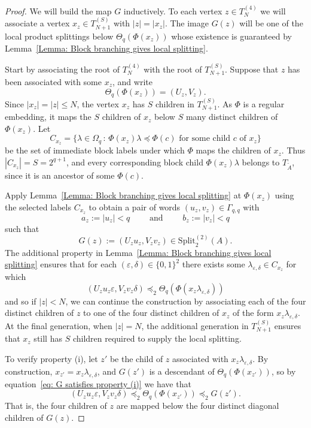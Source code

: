 \documentclass[11pt]{amsart}
\newcommand\labs[1]{\left\lvert#1\right\rvert}
\newcommand{\Split}{\mathrm{Split}}
\renewcommand{\leq}{\leqslant}
\theoremstyle{plain}
\theoremstyle{definition}
\theoremstyle{remark}
\begin{document}
\begin{proof}
We will build the map $G$ inductively. To each vertex $z \in T_N^{(4)}$ we will associate a vertex $x_z \in T_{N+1}^{(S)}$ with $\labs{z} = \labs{x_z}$. The image $G(z)$ will be one of the local product splittings below $\Theta_q(\Phi(x_z))$ whose existence is guaranteed by Lemma~\ref{Lemma: Block branching gives local splitting}.

Start by associating the root of $T_N^{(4)}$ with the root of $T_{N+1}^{(S)}$. Suppose that $z$ has been associated with some $x_z$, and write
\[ \Theta_q(\Phi(x_z)) = (U_z,V_z).\]
Since $\labs{x_z} = \labs{z} \leq N$, the vertex $x_z$ has $S$ children in $T_{N+1}^{(S)}$. As $\Phi$ is a regular embedding, it maps the $S$ children of $x_z$ below $S$ many distinct children of $\Phi(x_z)$. Let
\[ C_{x_z}=\{ \lambda \in \Omega_q \, : \, \Phi(x_z) \lambda \preceq \Phi(c) \text{ for some child } c \text{ of }x_z\}\]
be the set of immediate block labels under which $\Phi$ maps the children of $x_z$. Thus $\labs{C_{x_z}}=S=2^{q+1}$, and every corresponding block child $\Phi(x_z)\lambda$ belongs to $T_{\tilde{A}}$, since it is an ancestor of some $\Phi(c)$.

Apply Lemma~\ref{Lemma: Block branching gives local splitting} at $\Phi(x_z)$ using the selected labels $C_{x_z}$ to obtain a pair of words $(u_z,v_z) \in \Gamma_{q,q}$ with
\[a_z:=\labs{u_z} < q \qquad \text{ and } \qquad b_z:= \labs{v_z}<q\]
such that
\[ G(z):= (U_z u_z,V_z v_z) \in \Split_{2}^{(2)}(A).\]
The additional property in Lemma~\ref{Lemma: Block branching gives local splitting} ensures that for each $(\varepsilon,\delta)\in \{0,1\}^2$ there exists some $\lambda_{\varepsilon,\delta} \in C_{x_z}$ for which
\begin{equation}\label{eq: G satisfies property (i)}
(U_z u_z \varepsilon,V_z v_z \delta) \preceq_2 \Theta_q(\Phi(x_z \lambda_{\varepsilon,\delta}))
\end{equation}
and so if $\labs{z} < N$, we can continue the construction by associating each of the four distinct children of $z$ to one of the four distinct children of $x_z$ of the form $x_z \lambda_{\varepsilon,\delta}$. At the final generation, when $\labs{z} = N$, the additional generation in $T_{N+1}^{(S)}$ ensures that $x_z$ still has $S$ children required to supply the local splitting.

To verify property (i), let $z'$ be the child of $z$ associated with $x_z \lambda_{\varepsilon,\delta}$. By construction, $x_{z'} = x_z \lambda_{\varepsilon,\delta}$, and $G(z')$ is a descendant of $\Theta_q(\Phi(x_{z'}))$, so by equation~\eqref{eq: G satisfies property (i)} we have that
\[ (U_z u_z \varepsilon,V_z v_z \delta) \preceq_2 \Theta_q(\Phi(x_{z'})) \preceq_2 G(z').\]
That is, the four children of $z$ are mapped below the four distinct diagonal children of $G(z)$.


\end{proof}
\end{document}
